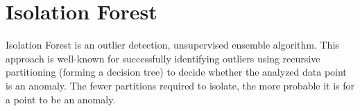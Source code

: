 \section{Isolation Forest}
\label{sec:isolation_forest}

Isolation Forest
\cite{liu2008isolation, liu2012isolation} is an outlier
detection, unsupervised ensemble algorithm. This approach is well-known for successfully identifying outliers using recursive partitioning (forming a decision tree) to decide whether the analyzed data point is an anomaly. The fewer partitions required to isolate, the more probable it is for a point to be an anomaly.







